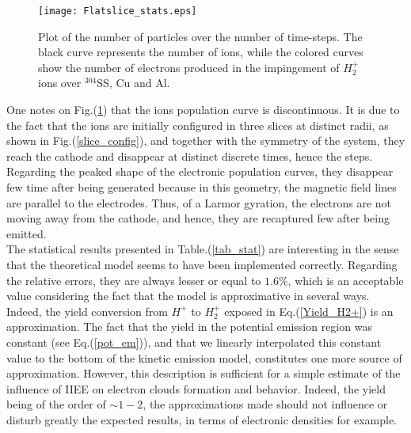 \begin{figure}[h!]
\centering
	\texttt{[image: Flatslice\_stats.eps]}
	\caption{\label{flat_slice} Plot of the number of particles over the number of time-steps. The black curve represents the number of ions, while the colored curves show the number of electrons produced in the impingement of $H_2^+$ ions over $^{304}$SS, Cu and Al.}
\end{figure}  

\noindent One notes on Fig.(\ref{flat_slice}) that the ions population curve is discontinuous. It is due to the fact that the ions are initially configured in three slices at distinct radii, as shown in Fig.(\ref{slice_config}), and together with the symmetry of the system, they reach the cathode and disappear at distinct discrete times, hence the steps. Regarding the peaked shape of the electronic population curves, they disappear few time after being generated because in this geometry, the magnetic field lines are parallel to the electrodes. Thus, of a Larmor gyration, the electrons are not moving away from the cathode, and hence, they are recaptured few after being emitted.\\

The statistical results presented in Table.(\ref{tab_stat}) are interesting in the sense that the theoretical model seems to have been implemented correctly. Regarding the relative errors, they are always lesser or equal to $1.6\%$, which is an acceptable value considering the fact that the model is approximative in several ways. Indeed, the yield conversion from $H^+$ to $H_2^{+}$ exposed in Eq.(\ref{Yield_H2+}) is an approximation. The fact that the yield in the potential emission region was constant (see Eq.(\ref{pot_em})), and that we linearly interpolated this constant value to the bottom of the kinetic emission model, constitutes one more source of approximation. However, this description is sufficient for a simple estimate of the influence of IIEE on electron clouds formation and behavior. Indeed, the yield being of the order of $\sim 1-2$, the approximations made should not influence or disturb greatly the expected results, in terms of electronic densities for example. \\

